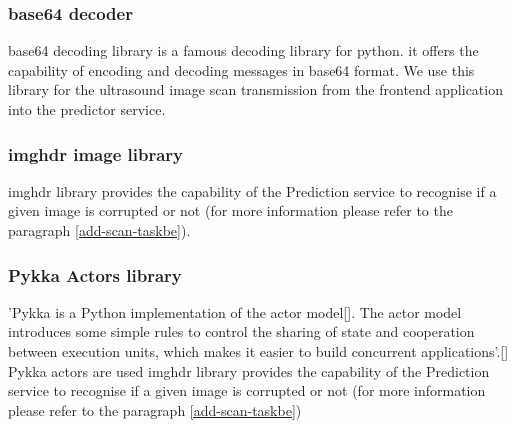 			\subsubsection{base64 decoder}
				base64 decoding library is a famous decoding library for python. it offers the capability of encoding and decoding messages in
				base64 format. We use this library for the ultrasound image scan transmission from the frontend application into the predictor
				service.
			\subsubsection{imghdr image library}
				imghdr library provides the capability of the Prediction service to recognise if a given image is corrupted or not
				(for more information please refer to the paragraph \ref{add-scan-taskbe}).
			\subsubsection{Pykka Actors library}
			
			
				'Pykka is a Python implementation of the actor model[\cite{hewitt2015actor}]. The actor model introduces some simple rules to control the sharing of state and cooperation between execution units, 
				which makes it easier to build concurrent applications'.[\cite{magnus_2010}]
				Pykka actors are used
				imghdr library provides the capability of the Prediction service to recognise if a given image is corrupted or not
				(for more information please refer to the paragraph \ref{add-scan-taskbe})
